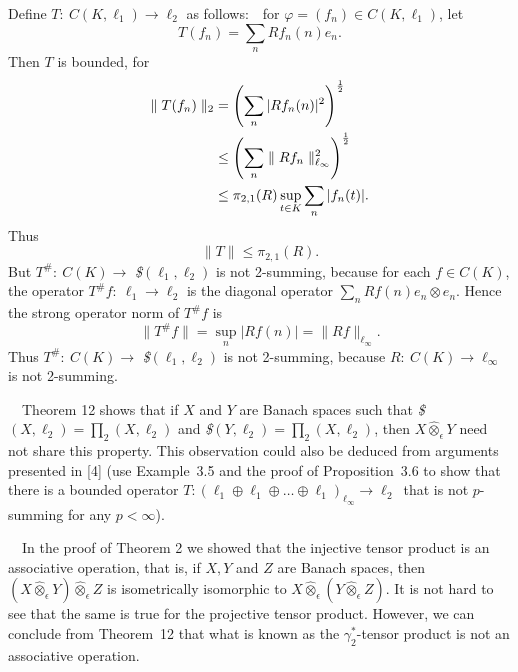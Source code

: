 \medskip

Define $T:\ C(K, \ell_1)\rightarrow
\ell_2$ as follows:\ \ for $\varphi=(f_n)\in C(K,\ell_1)$, let
$$
T(f_n)=\sum\limits_n Rf_n (n)e_n.
$$
Then $T$ is bounded, for
$$
\aligned
\parallel
T(f_n)\parallel_2&=\left(\sum\limits_n|Rf_n(n)|^2\right)^{\frac 12}\\
&\leq \left(\sum\limits_n \parallel
Rf_n\parallel^2_{\ell_\infty}\right)^{\frac 12}\\
&\leq \pi_{2,1}(R)\sup\limits_{t\in 
K}\sum\limits_n|f_n(t)|.\endaligned
$$
Thus
$$
\parallel T\parallel \leq \pi_{2,1}(R).
$$
But $T^\#:\ C(K)\longrightarrow$ {\it \$}$(\ell_1, \ell_2)$ is not
2-summing, because for each $f\in C(K)$, the operator $T^\#f:\
\ell_1\longrightarrow \ell_2$ is the diagonal operator
$\sum\limits_nRf(n)e_n\otimes e_n$.  Hence the strong operator norm of
$T^\#f$ is
$$
\parallel T^\#f\parallel =\sup\limits_n|Rf(n)|=\parallel
Rf\parallel_{\ell_\infty}.
$$
Thus $T^\#:\ C(K)\longrightarrow$ {\it \$}$(\ell_1, \ell_2)$ is not
2-summing, because $R:\ C(K)\longrightarrow \ell_\infty$ is not 
2-summing.
\endproof

\bigskip
{}

\ \ 
Theorem 12 shows that if $X$ and $Y$ are Banach spaces such that {\it 
\$}$(X,
\ell_2)=\prod_2(X, \ell_2)$ and {\it \$}$(Y, \ell_2)=\prod_2(X,
\ell_2)$, then $X\hat \otimes_\epsilon Y$ need not share this 
property.
This observation could also be deduced from arguments presented in [4] 
(use
Example~3.5 and the proof of Proposition~3.6 to show that there is a 
bounded
operator $T:(\ell_1\oplus\ell_1\oplus\ldots\oplus\ell_1)_{\ell_\infty}
\longrightarrow \ell_2$\ that is not $p$-summing for any $p<\infty$).

\medskip

\ \ In the proof of Theorem 2 we showed that 
the
injective tensor product is an associative operation, that is, if $X, 
Y$ and $Z$
are Banach spaces, then $(X\hat\otimes_\epsilon Y)\hat 
\otimes_\epsilon Z$ is
isometrically isomorphic to $X\hat \otimes_\epsilon (Y\hat 
\otimes_\epsilon
Z)$.  It is not hard to see that the same is true for the projective 
tensor
product. However, we can conclude from Theorem~12 that what is known 
as the
$\gamma_2^*$-tensor product is not an associative operation.

\medskip

